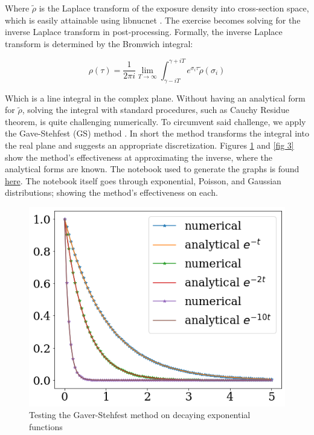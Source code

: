 \documentclass{article}
\begin{document}
Where $\tilde{\rho}$ is the Laplace transform of the exposure density into cross-section space, which is easily attainable using 
libnucnet \cite{meyer}. The exercise becomes solving for the inverse Laplace transform in post-processing. Formally, the inverse 
Laplace transform is determined by the Bromwich integral:

\begin{equation*}
    \rho(\tau) = \frac{1}{2\pi i} \lim_{T\to\infty}\int_{\gamma - iT}^{\gamma + iT}e^{\sigma_{i}\tau}\tilde{\rho}(\sigma_{i})
\end{equation*}

Which is a line integral in the complex plane. Without having an analytical form for $\tilde{\rho}$, solving the integral with standard 
procedures, such as Cauchy Residue theorem, is quite challenging numerically. To circumvent said challenge, we apply the Gave-Stehfest (GS) 
method \cite{jacquot1983gaver}. In short the method transforms the integral into the real plane and suggests an appropriate discretization. 
Figures \ref{fig 2} and \ref{fig 3} show the method's effectiveness at approximating the inverse, where the analytical forms are known. 
The notebook used to generate the graphs is found \href{https://github.com/jaadt7/gaver_stehfest}{here}. The notebook itself goes through 
exponential, Poisson, and Gaussian distributions; showing the method's effectiveness on each.

\begin{figure}[!htp]
    \centerline{\includegraphics[scale = 0.5]{images/exp_test_1.png}}
    \caption{Testing the Gaver-Stehfest method on decaying exponential functions}
    \label{fig 2}
\end{figure}
\end{document}
